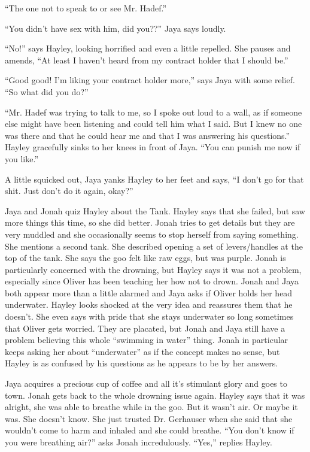 ``The one not to speak to or see Mr. Hadef.''

``You didn't have sex with him, did you??'' Jaya says loudly.

``No!'' says Hayley, looking horrified and even a little repelled.  She pauses and amends, ``At least I haven't heard from my contract holder that I should be.''

``Good good!  I'm liking your contract holder more,'' says Jaya with some relief.  ``So what did you do?''

``Mr. Hadef was trying to talk to me, so I spoke out loud to a wall, as if someone else might have been listening and could tell him what I said. But I knew no one was there and that he could hear me and that I was answering his questions.''  Hayley gracefully sinks to her knees in front of Jaya.  ``You can punish me now if you like.''  

A little squicked out, Jaya yanks Hayley to her feet and says, ``I don't go for that shit.  Just don't do it again, okay?''



Jaya and Jonah quiz Hayley about the Tank.  Hayley says that she failed, but saw more things this time, so she did better.   Jonah tries to get details but they are very muddled and she occasionally seems to stop herself from saying something.  She mentions a second tank.  She described opening a set of levers/handles at the top of the tank.  She says the goo felt like raw eggs, but was purple.  Jonah is particularly concerned with the drowning, but Hayley says it was not a problem, especially since Oliver has been teaching her how not to drown.  Jonah and Jaya both appear more than a little alarmed and Jaya asks if Oliver holds her head underwater.  Hayley looks shocked at the very idea and reassures them that he doesn't.  She even says with pride that she stays underwater so long sometimes that Oliver gets worried.  They are placated, but Jonah and Jaya still have a problem believing this whole ``swimming in water'' thing.  Jonah in particular keeps asking her about ``underwater'' as if the concept makes no sense, but Hayley is as confused by his questions as he appears to be by her answers.



Jaya acquires a precious cup of coffee and all it's stimulant glory and goes to town.  Jonah gets back to the whole drowning issue again.  Hayley says that it was alright, she was able to breathe while in the goo.  But it wasn't air.  Or maybe it was.  She doesn't know.  She just trusted Dr. Gerhauser when she said that she wouldn't come to harm and inhaled and she could breathe.  ``You don't know if you were breathing air?'' asks Jonah incredulously. ``Yes,'' replies Hayley.

